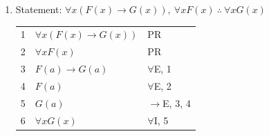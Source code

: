 \documentclass{article}
\begin{document}
\begin{enumerate}
    \item Statement: $\forall x(F(x)\to G(x)),\:\forall xF(x)\:\therefore\:\forall xG(x)$

          \begin{tabular}{l|p{8cm}l}
              \hline
              1 & $\forall x(F(x)\to G(x))$ & PR            \\
              2 & $\forall xF(x)$           & PR            \\
              3 & $F(a)\to G(a)$            & $\forall$E, 1 \\
              4 & $F(a)$                    & $\forall$E, 2 \\
              5 & $G(a)$                    & $\to$E, 3, 4  \\
              6 & $\forall xG(x)$           & $\forall$I, 5 \\
              \hline
          \end{tabular}
\end{enumerate}
\end{document}
